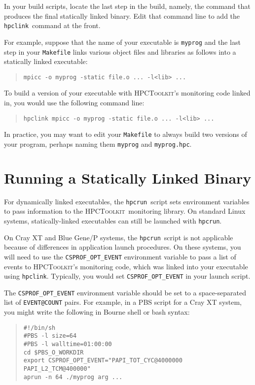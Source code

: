 \documentclass[12pt]{article}
\newcommand{\HPCToolkit}{\textsc{HPCToolkit}}
\newcommand{\hpcrun}{\texttt{hpcrun}}
\newcommand{\hpclink}{\texttt{hpclink}}
\begin{document}
In your build scripts, locate the last step in the build, namely,  the
command that produces the final statically linked binary.  Edit that command line to add the \hpclink\ command at the front.

For example, suppose that the name of your executable is {\tt myprog} and the last step in
your {\tt Makefile} links various object files and libraries as
follows into a statically linked executable:
%
\begin{quote}
\verb|mpicc -o myprog -static file.o ... -l<lib> ...|
\end{quote}
%
To build a version of your executable with \HPCToolkit's monitoring code linked in, you would use the
following command line:
%
\begin{quote}
\verb|hpclink mpicc -o myprog -static file.o ... -l<lib> ...|
\end{quote}

In practice, you may want to edit your {\tt Makefile} to always build
two versions of your program, perhaps naming them {\tt myprog} and
{\tt myprog.hpc}.

\section{Running a Statically Linked Binary}

For dynamically linked executables, the \hpcrun\ script sets environment variables to
pass information to the \HPCToolkit\ monitoring library. On standard Linux systems,  statically-linked executables can still be launched with \hpcrun. 

On Cray XT and Blue Gene/P systems,  the  \hpcrun\   script is not applicable because of differences in application launch procedures.
On these systems, you will need to use the {\tt CSPROF\_OPT\_EVENT} environment variable to pass a list of events to \HPCToolkit's monitoring code, which was linked into your executable using \hpclink.
Typically, you would set {\tt CSPROF\_OPT\_EVENT}  in your launch script.

The {\tt CSPROF\_OPT\_EVENT} environment variable
should be set to a space-separated list of {\tt EVENT@COUNT} pairs.
For example, in a PBS script for a Cray XT system, you might write the following in Bourne shell or bash syntax:

\begin{quote}
\begin{verbatim}
#!/bin/sh
#PBS -l size=64
#PBS -l walltime=01:00:00
cd $PBS_O_WORKDIR
export CSPROF_OPT_EVENT="PAPI_TOT_CYC@4000000 PAPI_L2_TCM@400000"
aprun -n 64 ./myprog arg ...
\end{verbatim}
\end{quote}
\end{document}
